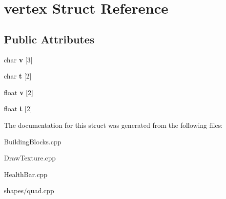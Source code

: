 \hypertarget{structvertex}{\section{vertex \-Struct \-Reference}
\label{structvertex}
}
\subsection*{\-Public \-Attributes}
\begin{DoxyCompactItemize}
\item 
\hypertarget{structvertex_a58b1910ce8ffc1cb2ee833c81b795fdf}{char {\bfseries v} \mbox{[}3\mbox{]}}\label{structvertex_a58b1910ce8ffc1cb2ee833c81b795fdf}

\item 
\hypertarget{structvertex_a05a5118bf20cb54f1b563f7f934ebc6a}{char {\bfseries t} \mbox{[}2\mbox{]}}\label{structvertex_a05a5118bf20cb54f1b563f7f934ebc6a}

\item 
\hypertarget{structvertex_ad387e5f1efc55b69b9c3380d30b1109a}{float {\bfseries v} \mbox{[}2\mbox{]}}\label{structvertex_ad387e5f1efc55b69b9c3380d30b1109a}

\item 
\hypertarget{structvertex_a808db5683e2f29c98a6456827a11e86c}{float {\bfseries t} \mbox{[}2\mbox{]}}\label{structvertex_a808db5683e2f29c98a6456827a11e86c}

\end{DoxyCompactItemize}


\-The documentation for this struct was generated from the following files\-:\begin{DoxyCompactItemize}
\item 
\-Building\-Blocks.\-cpp\item 
\-Draw\-Texture.\-cpp\item 
\-Health\-Bar.\-cpp\item 
shapes/quad.\-cpp\end{DoxyCompactItemize}
